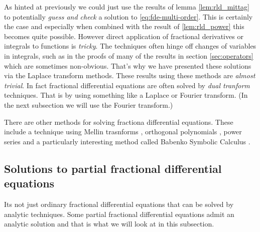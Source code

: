 As hinted at previously we could just use the results of lemma \ref{lem:rld_mittag} to potentially \emph{guess and check} a solution to \ref{eq:fde-multi-order}. This is certainly the case and especially when combined with the result of \ref{lem:rld_power} this becomes quite possible. However direct application of fractional derivatives or integrals to functions is \emph{tricky}. The techniques often hinge off changes of variables in integrals, such as in the proofs of many of the results in section \ref{sec:operators} which are sometimes non-obvious. That's why we have presented these solutions via the Laplace transform methods. These results using these methods are \emph{almost trivial}. In fact fractional differential equations are often solved by \emph{dual tranform} techniques. That is by using something like a Laplace or Fourier transform. (In the next subsection we will use the Fourier transform.)

There are other methods for solving fractiona differential equations. These include a technique using Mellin trasnforms \cite{Podlubny1999, Kober1940, Samko1993, Butera2014}, orthogonal polynomials \cite{Podlubny1999}, power series \cite{Podlubny1999, Samko1993, Arikoglu2007} and a particularly interesting method called Babenko Symbolic Calculus \cite{Podlubny1999, Gorenflo1997b}.

\subsection{Solutions to partial fractional differential equations}
Its not just ordinary fractional differential equations that can be solved by analytic techniques. Some partial fractional differential equations admit an analytic solution and that is what we will look at in this subsection.

